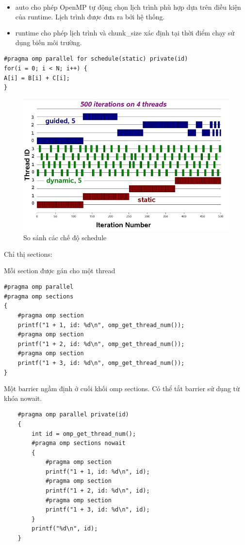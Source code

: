 \documentclass[14pt, a4paper]{article}
\numberwithin{equation}{section}
\numberwithin{figure}{section}
\numberwithin{dl}{section}
\numberwithin{md}{section}
\numberwithin{bd}{section}
\numberwithin{dn}{section}
\numberwithin{hq}{section}
\begin{document}
\begin{itemize}
    \item auto cho phép OpenMP tự động chọn lịch trình phù hợp dựa trên điều kiện của runtime.
    Lịch trình được đưa ra bởi hệ thống.
    \item runtime cho phép lịch trình và chunk\_size xác định tại thời điểm chạy sử dụng biến môi trường.
\end{itemize}
\begin{verbatim}
#pragma omp parallel for schedule(static) private(id)
for(i = 0; i < N; i++) {
A[i] = B[i] + C[i];
}
\end{verbatim}

\begin{figure}[H]
    \centering
    \includegraphics[width=0.8\linewidth]{figures/OpenMP/Schedule_Modes_Comparison.png}
    \caption{So sánh các chế độ schedule}
\end{figure}

Chỉ thị sections:

Mỗi section được gán cho một thread
    \begin{verbatim}
#pragma omp parallel
#pragma omp sections
{
    #pragma omp section
    printf("1 + 1, id: %d\n", omp_get_thread_num());
    #pragma omp section
    printf("1 + 2, id: %d\n", omp_get_thread_num());
    #pragma omp section
    printf("1 + 3, id: %d\n", omp_get_thread_num());
}
    \end{verbatim}

Một barrier ngầm định ở cuối khối omp sections.
Có thể tắt barrier sử dụng từ khóa nowait.

\begin{verbatim}
    #pragma omp parallel private(id)
    {
        int id = omp_get_thread_num();
        #pragma omp sections nowait
        {
            #pragma omp section
            printf("1 + 1, id: %d\n", id);
            #pragma omp section
            printf("1 + 2, id: %d\n", id);
            #pragma omp section
            printf("1 + 3, id: %d\n", id);
        }
        printf("%d\n", id);
    }
\end{verbatim}
\end{document}
